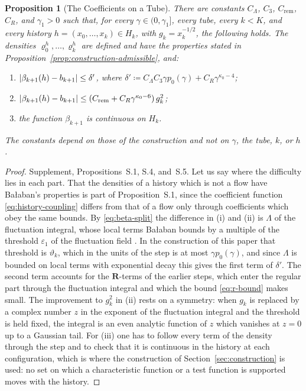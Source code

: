 \documentclass[11pt]{preprint}
\DeclarePairedDelimiter{\abs}{\lvert}{\rvert}
\numberwithin{equation}{section}
\newtheorem{proposition}[theorem]{Proposition}
\theoremstyle{definition}
\theoremstyle{remark}
\theoremstyle{plain}
\begin{document}
\begin{proposition}[The Coefficients on a Tube]\label{prop:coefficients}
There are constants $C_\Lambda$, $C_3$, $C_{\mathrm{rem}}$, $C_R$, and $\gamma_1 > 0$ such that, for every $\gamma \in (0, \gamma_1]$, every tube, every $k < K$, and every history $h = (x_0, \dots, x_k) \in H_k$, with $g_k = x_k^{-1/2}$, the following holds. The densities $\varrho^h_0, \dots, \varrho^h_k$ are defined and have the properties stated in Proposition~\ref{prop:construction-admissible}, and:
\begin{enumerate}[label=(\roman*)]
\item $\abs{\beta_{k+1}(h) - b_{k+1}} \leq \delta'$, where $\delta' \coloneqq C_\Lambda C_3\gamma p_0(\gamma) + C_R\gamma^{\kappa_0-4}$;
\item $\abs{\beta_{k+1}(h) - b_{k+1}} \leq (C_{\mathrm{rem}} + C_R\gamma^{\kappa_0-6})\,g_k^2$;
\item the function $\beta_{k+1}$ is continuous on $H_k$.
\end{enumerate}
The constants depend on those of the construction and not on $\gamma$, the tube, $k$, or $h$.
\end{proposition}

\begin{proof}
Supplement, Propositions~S.1, S.4, and~S.5. Let us say where the difficulty lies in each part. That the densities of a history which is not a flow have Ba{\l}aban's properties is part of Proposition~S.1, since the coefficient function \eqref{eq:history-coupling} differs from that of a flow only through coefficients which obey the same bounds. By \eqref{eq:beta-split} the difference in (i) and (ii) is $\Lambda$ of the fluctuation integral, whose local terms Ba{\l}aban bounds by a multiple of the threshold $\varepsilon_1$ of the fluctuation field \cite[(2.41), p.~21]{BalabanRG2}. In the construction of this paper that threshold is $\vartheta_k$, which in the units of the step is at most $\gamma p_0(\gamma)$, and since $\Lambda$ is bounded on local terms with exponential decay this gives the first term of $\delta'$. The second term accounts for the $\mathbf R$-terms of the earlier steps, which enter the regular part through the fluctuation integral and which the bound \eqref{eq:r-bound} makes small. The improvement to $g_k^2$ in (ii) rests on a symmetry: when $g_k$ is replaced by a complex number $z$ in the exponent of the fluctuation integral and the threshold is held fixed, the integral is an even analytic function of $z$ which vanishes at $z = 0$ up to a Gaussian tail. For (iii) one has to follow every term of the density through the step and to check that it is continuous in the history at each configuration, which is where the construction of Section~\ref{sec:construction} is used: no set on which a characteristic function or a test function is supported moves with the history.
\end{proof}
\end{document}
